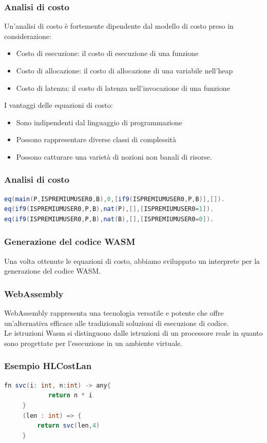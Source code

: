 \documentclass[xcolor=dvipsnames]{beamer}
\begin{document}
\begin{frame}
    \frametitle{Analisi di costo}
    Un'analisi di costo è fortemente dipendente dal modello di costo preso in considerazione:
    \begin{itemize}
        \item \alert{Costo di esecuzione}: il costo di esecuzione di una funzione
        \item \alert{Costo di allocazione}: il costo di allocazione di una variabile nell'heap
        \item \alert{Costo di latenza}: il costo di latenza nell'invocazione di una funzione
    \end{itemize}
    I vantaggi delle equazioni di costo:
    \begin{itemize}
        \item Sono \alert{indipendenti} dal linguaggio di programmazione
        \item Possono rappresentare diverse classi di \alert{complessità}
        \item Possono catturare una varietà di nozioni non banali di risorse.
    \end{itemize}
\end{frame}
\begin{frame}[fragile]
    \frametitle{Analisi di costo}
\begin{lstlisting}[language=Java, caption={Equazioni di costo per Listing 8}]
eq(main(P,ISPREMIUMUSER0,B),0,[if9(ISPREMIUMUSER0,P,B)],[]).
eq(if9(ISPREMIUMUSER0,P,B),nat(P),[],[ISPREMIUMUSER0=1]).
eq(if9(ISPREMIUMUSER0,P,B),nat(B),[],[ISPREMIUMUSER0=0]).
\end{lstlisting}
\end{frame}
\begin{frame}
    \frametitle{Generazione del codice WASM}
    Una volta ottenute le equazioni di costo, abbiamo sviluppato un interprete per la generazione del codice WASM.
\end{frame}
\begin{frame}
    \frametitle{WebAssembly}
    \alert{WebAssembly} rappresenta una tecnologia versatile e potente che offre un'alternativa efficace alle tradizionali soluzioni di esecuzione di codice.\\
    Le istruzioni \alert{Wasm} si distinguono dalle istruzioni di un processore reale in quanto sono progettate per l'esecuzione in un ambiente virtuale.

\end{frame}
\begin{frame}[fragile]
    \frametitle{Esempio HLCostLan}
    \begin{lstlisting}[language=Java, caption={Esempio di funzione HLCostLan, Listing15}]
        fn svc(i: int, n:int) -> any{
            return n * i
     }
     (len : int) => {
         return svc(len,4)
     }
    \end{lstlisting}
\end{frame}
\end{document}
